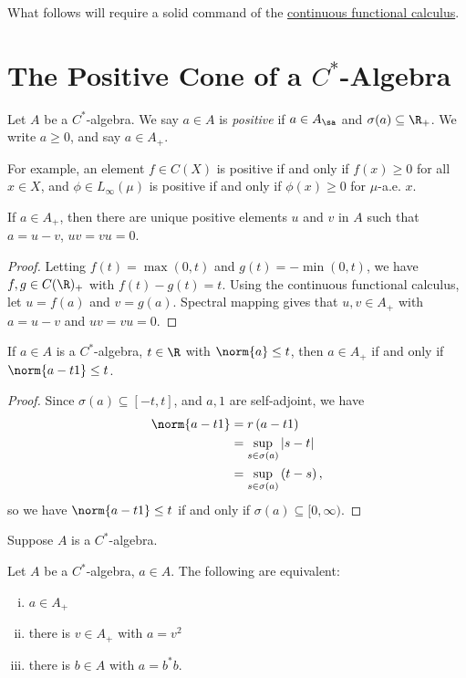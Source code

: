 \documentclass[10pt]{mypackage}
\begin{document}
\RaggedRight
What follows will require a solid command of the \href{https://ai.avinash-iyer.com/Classes_and_Homework/After\%20College/Other\%20Notes/continuous_functional_calculus.pdf}{continuous functional calculus}.
\section{The Positive Cone of a $C^{\ast}$-Algebra}%
\begin{definition}
  Let $A$ be a $C^{\ast}$-algebra. We say $a\in A$ is \textit{positive} if $a\in A_{\sa}$ and $\sigma(a)\subseteq \R_{+}$. We write $a\geq 0$, and say $a\in A_{+}$.
\end{definition}
For example, an element $f\in C(X)$ is positive if and only if $f(x)\geq 0$ for all $x\in X$, and $\phi\in L_{\infty}(\mu)$ is positive if and only if $\phi(x)\geq 0$ for $\mu$-a.e. $x$.
\begin{proposition}
  If $a\in A_{+}$, then there are unique positive elements $u$ and $v$ in $A$ such that $a = u-v$, $uv = vu = 0$.
\end{proposition}
\begin{proof}
  Letting $f(t) = \max(0,t)$ and $g(t) = -\min(0,t)$, we have $f,g\in C(\R)_{+}$ with $f(t) - g(t) = t$. Using the continuous functional calculus, let $u = f(a)$ and $v = g(a)$. Spectral mapping gives that $u,v\in A_{+}$ with $a = u-v$ and $uv = vu = 0$.
\end{proof}
\begin{lemma}
  If $a\in A$ is a $C^{\ast}$-algebra, $t\in \R$ with $\norm{a}\leq t$, then $a\in A_{+}$ if and only if $\norm{a-t1}\leq t$.
\end{lemma}
\begin{proof}
  Since $\sigma(a)\subseteq [-t,t]$, and $a,1$ are self-adjoint, we have
  \begin{align*}
    \norm{a-t1} &= r\left( a-t1 \right)\\
                &= \sup_{s\in \sigma(a)} \left\vert s-t \right\vert\\
                &= \sup_{s\in \sigma(a)} \left( t-s \right),
  \end{align*}
  so we have $\norm{a-t1}\leq t$ if and only if $\sigma(a)\subseteq [0,\infty)$.
\end{proof}
\begin{theorem}
  Suppose $A$ is a $C^{\ast}$-algebra.
\end{theorem}
\begin{proposition}
  Let $A$ be a $C^{\ast}$-algebra, $a\in A$. The following are equivalent:
  \begin{enumerate}[(i)]
    \item $a\in A_{+}$
    \item there is $v\in A_{+}$ with $a = v^2$
    \item there is $b\in A$ with $a = b^{\ast}b$.
  \end{enumerate}
\end{proposition}
\end{document}
